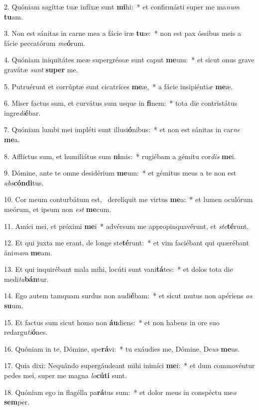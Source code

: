 2. Quóniam sagíttæ tuæ infíxæ sunt \textbf{mi}hi:~*  et confirmásti super me ma\textit{num} \textbf{tu}am.\

3. Non est sánitas in carne mea a fácie iræ \textbf{tu}æ:~*  non est pax óssibus meis a fácie peccatórum \textit{me}\textbf{ó}rum.\

4. Quóniam iniquitátes meæ supergréssæ sunt caput \textbf{me}um:~*  et sicut onus grave gravátæ \textit{sunt} \textbf{su}\textbf{per} me.\

5. Putruérunt et corrúptæ sunt cicatríces \textbf{me}æ,~*  a fácie insipiénti\textit{æ} \textbf{me}æ.\

6. Miser factus sum, et curvátus sum usque in \textbf{fi}nem:~*  tota die contristátus ingre\textit{di}\textbf{é}bar.\

7. Quóniam lumbi mei impléti sunt illusi\textbf{ó}nibus:~*  et non est sánitas in car\textit{ne} \textbf{me}a.\

8. Afflíctus sum, et humiliátus sum \textbf{ni}mis:~*  rugiébam a gémitu cor\textit{dis} \textbf{me}i.\

9. Dómine, ante te omne desidérium \textbf{me}um:~*  et gémitus meus a te non est \textit{abs}\textbf{cón}\textbf{di}tus.\

10. Cor meum conturbátum est, \dag\  derelíquit me virtus \textbf{me}a:~*  et lumen oculórum meórum, et ipsum non \textit{est} \textbf{me}cum.\

11. Amíci mei, et próximi \textbf{me}i~*  advérsum me appropinquavérunt, et \textit{ste}\textbf{té}runt.\

12. Et qui juxta me erant, de longe ste\textbf{té}runt:~*  et vim faciébant qui quærébant áni\textit{mam} \textbf{me}am.\

13. Et qui inquirébant mala mihi, locúti sunt vani\textbf{tá}tes:~*  et dolos tota die medi\textit{ta}\textbf{bán}tur.\

14. Ego autem tamquam surdus non audi\textbf{é}bam:~*  et sicut mutus non apériens \textit{os} \textbf{su}um.\

15. Et factus sum sicut homo non \textbf{áu}diens:~*  et non habens in ore suo redargu\textit{ti}\textbf{ó}nes.\

16. Quóniam in te, Dómine, spe\textbf{rá}vi:~*  tu exáudies me, Dómine, De\textit{us} \textbf{me}us.\

17. Quia dixi: Nequándo supergáudeant mihi inimíci \textbf{me}i:~*  et dum commovéntur pedes mei, super me magna \textit{lo}\textbf{cú}\textbf{ti} sunt.\

18. Quóniam ego in flagélla pa\textbf{rá}tus sum:~*  et dolor meus in conspéctu me\textit{o} \textbf{sem}per.\


